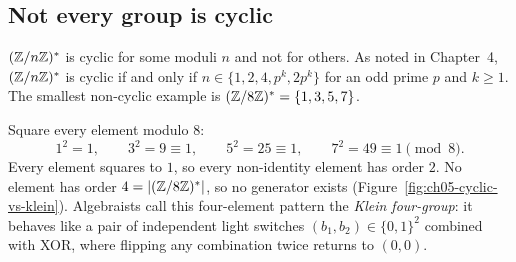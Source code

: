 \subsection{Not every group is cyclic}

$(\mathbb{Z}/n\mathbb{Z})^{*}$ is cyclic for some moduli $n$ and not for others. As noted in Chapter~4, $(\mathbb{Z}/n\mathbb{Z})^{*}$ is cyclic if and only if
$n \in \{1, 2, 4, p^k, 2p^k\}$ for an odd prime $p$ and $k \ge 1$. The smallest non-cyclic example is
$(\mathbb{Z}/8\mathbb{Z})^{*} = \{1,3,5,7\}$.

\begin{example}
\label{ch05:ex-zns8}
Square every element modulo $8$:
\[
  1^2 = 1, \qquad
  3^2 = 9 \equiv 1, \qquad
  5^2 = 25 \equiv 1, \qquad
  7^2 = 49 \equiv 1 \pmod{8}.
\]
Every element squares to $1$, so every non-identity element has order $2$. No
element has order $4 = \lvert(\mathbb{Z}/8\mathbb{Z})^{*}\rvert$, so no generator exists (Figure~\ref{fig:ch05-cyclic-vs-klein}). Algebraists call this four-element pattern the \emph{Klein four-group}: it behaves like a pair of independent light switches $(b_1, b_2) \in \{0,1\}^2$ combined with XOR, where flipping any combination twice returns to $(0,0)$.
\end{example}

